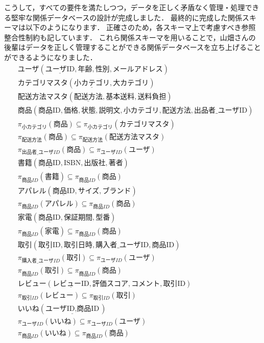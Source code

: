 こうして，すべての要件を満たしつつ，データを正しく矛盾なく管理・処理できる堅牢な関係データベースの設計が完成しました．
最終的に完成した関係スキーマは以下のようになります．
正確さのため，各スキーマ上で考慮すべき参照整合性制約も記しています．
これら関係スキーマを用いることで，山畑さんの後輩はデータを正しく管理することができる関係データベースを立ち上げることができるようになりました．
\begin{align}
&\textbf{ユーザ}(\underline{\text{ユーザID}}, \text{年齢}, \text{性別}, \text{メールアドレス}) \\[7pt]
&\textbf{カテゴリマスタ}(\underline{\text{小カテゴリ}}, \text{大カテゴリ}) \\[7pt]
&\textbf{配送方法マスタ}(\underline{\text{配送方法}}, \text{基本送料}, \text{送料負担}) \\[7pt]
&\textbf{商品}(\underline{\text{商品ID}}, \text{価格}, \text{状態}, \text{説明文}, \text{小カテゴリ}, \text{配送方法}, \text{出品者\_ユーザID}) \\
&\pi_{小カテゴリ}(\textbf{商品}) \subseteq \pi_{小カテゴリ}(\textbf{カテゴリマスタ}) \\
&\pi_{配送方法}(\textbf{商品}) \subseteq \pi_{配送方法}(\textbf{配送方法マスタ}) \\
&\pi_{出品者\_ユーザID}(\textbf{商品}) \subseteq \pi_{ユーザID}(\textbf{ユーザ}) \\[7pt]
&\textbf{書籍}(\underline{\text{商品ID}}, \text{ISBN}, \text{出版社}, \text{著者}) \\
&\pi_{商品ID}(\textbf{書籍}) \subseteq \pi_{商品ID}(\textbf{商品}) \\[7pt]
&\textbf{アパレル}(\underline{\text{商品ID}}, \text{サイズ}, \text{ブランド}) \\
&\pi_{商品ID}(\textbf{アパレル}) \subseteq \pi_{商品ID}(\textbf{商品}) \\[7pt]
&\textbf{家電}(\underline{\text{商品ID}}, \text{保証期間}, \text{型番}) \\
&\pi_{商品ID}(\textbf{家電}) \subseteq \pi_{商品ID}(\textbf{商品}) \\[7pt]
&\textbf{取引}(\underline{\text{取引ID}}, \text{取引日時}, \text{購入者\_ユーザID}, \text{商品ID}) \\
&\pi_{購入者\_ユーザID}(\textbf{取引}) \subseteq \pi_{ユーザID}(\textbf{ユーザ}) \\
&\pi_{商品ID}(\textbf{取引}) \subseteq \pi_{商品ID}(\textbf{商品}) \\[7pt]
&\textbf{レビュー}(\underline{\text{レビューID}}, \text{評価スコア}, \text{コメント}, \text{取引ID}) \\
&\pi_{取引ID}(\textbf{レビュー}) \subseteq \pi_{取引ID}(\textbf{取引}) \\[7pt]
&\textbf{いいね}(\underline{\text{ユーザID}, \text{商品ID}}) \\
&\pi_{ユーザID}(\textbf{いいね}) \subseteq \pi_{ユーザID}(\textbf{ユーザ}) \\
&\pi_{商品ID}(\textbf{いいね}) \subseteq \pi_{商品ID}(\textbf{商品})
\end{align}


